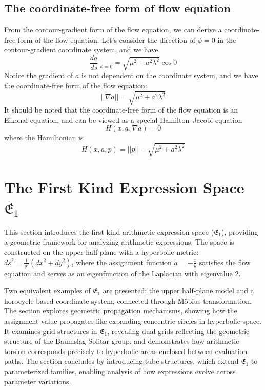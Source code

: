 \documentclass[12pt]{article}
\begin{document}
\subsection{The coordinate-free form of flow equation}\label{subsec:coordinate-free-full}
From the contour-gradient form of the flow equation, we can derive a coordinate-free form of the flow equation.
Let's consider the direction of \(\phi = 0\) in the contour-gradient coordinate system, and we have
\[
    \frac{da}{ds}|_{\phi = 0} = \sqrt{\mu^2 + a^2 \lambda^2} \cos 0
\]
Notice the gradient of \(a\) is not dependent on the coordinate system, and we have the coordinate-free form of the flow equation:
\begin{equation}\label{eq:coordinate-free-full}
||\nabla a|| = \sqrt{\mu^2 + a^2 \lambda^2}
\end{equation}
It should be noted that the coordinate-free form of the flow equation is an Eikonal equation,
and can be viewed as a special Hamilton–Jacobi equation
\[
H(x, a, \nabla a) = 0
\]
where the Hamiltonian is
\begin{equation}\label{eq:hamiltonian-full}
    H(x, a, p) = ||p|| - \sqrt{\mu^2 + a^2 \lambda^2}
\end{equation}

\section{The First Kind Expression Space $\mathfrak{E}_1$}

This section introduces the first kind arithmetic expression space ($\mathfrak{E}_1$), providing a geometric framework for analyzing arithmetic expressions. The space is constructed on the upper half-plane with a hyperbolic metric: $ds^2 = \frac{1}{y^2} (dx^2 + dy^2)$, where the assignment function $a = - \frac{x}{y}$ satisfies the flow equation and serves as an eigenfunction of the Laplacian with eigenvalue 2.

Two equivalent examples of $\mathfrak{E}_1$ are presented: the upper half-plane model and a horocycle-based coordinate system, connected through Möbius transformation. The section explores geometric propagation mechanisms, showing how the assignment value propagates like expanding concentric circles in hyperbolic space. It examines grid structures in $\mathfrak{E}_1$, revealing dual grids reflecting the geometric structure of the Baumslag-Solitar group, and demonstrates how arithmetic torsion corresponds precisely to hyperbolic areas enclosed between evaluation paths. The section concludes by introducing tube structures, which extend $\mathfrak{E}_1$ to parameterized families, enabling analysis of how expressions evolve across parameter variations.
\end{document}
